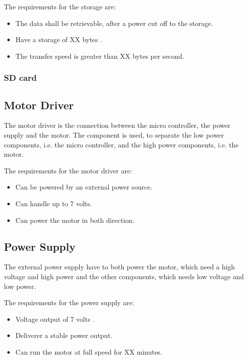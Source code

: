The requirements for the storage are:
\begin{itemize}
\item The data shall be retrievable, after a power cut off to the storage. 
\item Have a storage of XX bytes .
\item The transfer speed is greater than XX bytes per second. 
\end{itemize}

\subsubsection{SD card}



\subsection{Motor Driver}
The motor driver is the connection between the micro controller, the power supply and the motor. The component is used, to separate the low power components, i.e. the micro controller, and the high power components, i.e. the motor.

The requirements for the motor driver are:
\begin{itemize}
\item Can be powered by an external power source.
\item Can handle up to 7 volts. 
\item Can power the motor in both direction.
\end{itemize}



\subsection{Power Supply}
The external power supply have to both power the motor, which need a high voltage and high power and the other components, which needs low voltage and low power.

The requirements for the power supply are:
\begin{itemize}
\item Voltage output of 7 volts .
\item Deliverer a stable power output.
\item Can run the motor at full speed for XX  minutes.
\end{itemize}



